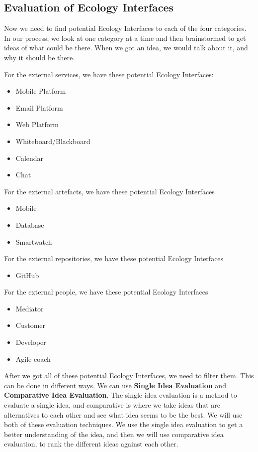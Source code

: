 \subsection{Evaluation of Ecology Interfaces}

Now we need to find potential Ecology Interfaces to each of the four categories.
In our process, we look at one category at a time and then brainstormed to get ideas of what could be there.
When we got an idea, we would talk about it, and why it should be there.

For the external services, we have these potential Ecology Interfaces:

\begin{itemize}
    \item Mobile Platform
    \item Email Platform
    \item Web Platform
    \item Whiteboard/Blackboard
    \item Calendar
    \item Chat 
\end{itemize}

For the external artefacts, we have these potential Ecology Interfaces

\begin{itemize}
    \item Mobile
    \item Database
    \item Smartwatch
\end{itemize}

For the external repositories, we have these potential Ecology Interfaces

\begin{itemize}
    \item GitHub
\end{itemize}

For the external people, we have these potential Ecology Interfaces

\begin{itemize}
    \item Mediator
    \item Customer
    \item Developer
    \item Agile coach
\end{itemize}

After we got all of these potential Ecology Interfaces, we need to filter them.
This can be done in different ways.
We can use \textbf{Single Idea Evaluation} and \textbf{Comparative Idea Evaluation}.
The single idea evaluation is a method to evaluate a single idea, and comparative is where we take ideas that are alternatives to each other and see what idea seems to be the best.
We will use both of these evaluation techniques.
We use the single idea evaluation to get a better understanding of the idea, and then we will use comparative idea evaluation, to rank the different ideas against each other.

